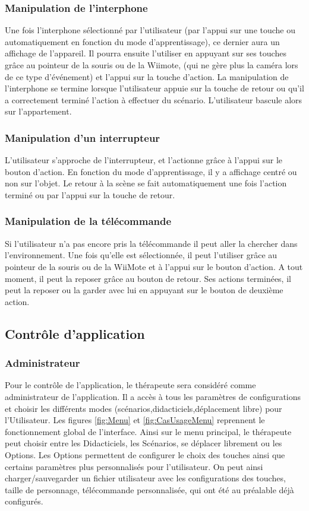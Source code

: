 \subsubsection{Manipulation de l’interphone }
Une fois l’interphone sélectionné par l’utilisateur (par l’appui sur une touche ou automatiquement en fonction du mode d’apprentissage), ce dernier aura un affichage de l’appareil. Il pourra ensuite l’utiliser en appuyant sur ses touches grâce au pointeur de la souris ou de la Wiimote, (qui ne gère plus la caméra lors de ce type d’événement) et l’appui sur la touche d’action. La manipulation de l’interphone se termine lorsque l’utilisateur appuie sur la touche de retour ou qu’il a correctement terminé l’action à effectuer du scénario. L’utilisateur bascule alors sur l’appartement.

\subsubsection{Manipulation d’un interrupteur}
L’utilisateur s’approche de l’interrupteur, et l’actionne grâce à l’appui sur le bouton d’action. En fonction du mode d’apprentissage, il y a affichage centré ou non sur l’objet. Le retour à la scène se fait automatiquement une fois l’action terminé ou par l’appui sur la touche de retour.

\subsubsection{Manipulation de la télécommande}
Si l’utilisateur n’a pas encore pris la télécommande il peut aller la chercher dans l’environnement. Une fois qu’elle est sélectionnée, il peut l’utiliser grâce au pointeur de la souris ou de la WiiMote et à l’appui sur le bouton d’action. A tout moment, il peut la reposer grâce au bouton de retour. Ses actions terminées, il peut la reposer ou la garder avec lui en appuyant sur le bouton de deuxième action.

\subsection{Contrôle d’application}
\subsubsection{Administrateur}
Pour le contrôle de l'application, le thérapeute sera considéré comme administrateur de l'application. Il a accès à
tous les paramètres de configurations et choisir les différents modes (scénarios,didacticiels,déplacement libre) pour l'Utilisateur.
\newline
Les figures \ref{fig:Menu} et \ref{fig:CasUsageMenu} reprennent le fonctionnement global de l'interface. Ainsi sur le menu principal, le thérapeute peut choisir entre les Didacticiels, les Scénarios, se déplacer librement ou les Options.
\newline
Les Options permettent de configurer le choix des touches ainsi que certains paramètres plus personnalisés pour l'utilisateur. On peut ainsi charger/sauvegarder un fichier utilisateur avec les configurations des touches, taille de personnage, télécommande personnalisée, qui ont été au préalable déjà configurés.

